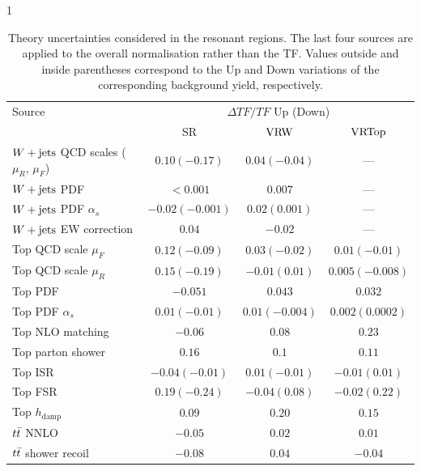 \begin{table}[htbp]
    \centering
    \begin{spacing}{1}
    \captionsetup{font=footnotesize}
    \setlength{\tabcolsep}{3pt}
    \renewcommand{\arraystretch}{0.95}
    \fontsize{9}{10.5}\selectfont
    \caption[Theory uncertainties in the resonant regions]{Theory uncertainties considered in the resonant regions. The last four sources are applied to the overall normalisation rather than the TF. Values outside and inside parentheses correspond to the Up and Down variations of the corresponding background yield, respectively.}
    \label{tab:ch9_theory_res}
    \label{tab:ch9_theory_transfer}
    \begin{tabular*}{\textwidth}{@{\extracolsep{\fill}}lccc@{}}
        \toprule
        Source & \multicolumn{3}{c}{$\Delta TF/TF$ Up (Down)} \\
        & SR & $\mathrm{VRW}$ & $\mathrm{VRTop}$ \\
        \midrule
        $W+\mathrm{jets}$ QCD scales ($\mu_R$, $\mu_F$) & $0.10 (-0.17)$ & $0.04 (-0.04)$ & --- \\
        $W+\mathrm{jets}$ PDF & $<0.001$ & $0.007$ & --- \\
        $W+\mathrm{jets}$ PDF $\alpha_s$ & $-0.02 (-0.001)$ & $0.02 (0.001)$ & --- \\
        $W+\mathrm{jets}$ EW correction & $0.04$ & $-0.02$ & --- \\
        \midrule
        Top QCD scale $\mu_F$ & $0.12 (-0.09)$ & $0.03 (-0.02)$ & $0.01 (-0.01)$ \\
        Top QCD scale $\mu_R$ & $0.15 (-0.19)$ & $-0.01 (0.01)$ & $0.005 (-0.008)$ \\
        Top PDF & $-0.051$ & $0.043$ & $0.032$ \\
        Top PDF $\alpha_s$ & $0.01 (-0.01)$ & $0.01 (-0.004)$ & $0.002 (0.0002)$ \\
        Top NLO matching & $-0.06$ & $0.08$ & $0.23$ \\
        Top parton shower & $0.16$ & $0.1$ & $0.11$ \\
        Top ISR & $-0.04 (-0.01)$ & $0.01 (-0.01)$ & $-0.01 (0.01)$ \\
        Top FSR & $0.19 (-0.24)$ & $-0.04 (0.08)$ & $-0.02 (0.22)$ \\
        Top $h_{\mathrm{damp}}$ & $0.09$ & $0.20$ & $0.15$ \\
        $t\bar{t}$ NNLO & $-0.05$ & $0.02$ & $0.01$ \\
        $t\bar{t}$ shower recoil & $-0.08$ & $0.04$ & $-0.04$ \\

\end{tabular*}
\end{spacing}
\end{table}
